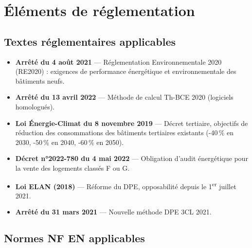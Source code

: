\section{Éléments de réglementation}

\subsection{Textes réglementaires applicables}

\begin{itemize}
  \item \textbf{Arrêté du 4 août 2021} — Réglementation Environnementale 2020 (RE2020) : exigences de performance énergétique et environnementale des bâtiments neufs.
  \item \textbf{Arrêté du 13 avril 2022} — Méthode de calcul Th-BCE 2020 (logiciels homologués).
  \item \textbf{Loi Énergie-Climat du 8 novembre 2019} — Décret tertiaire, objectifs de réduction des consommations des bâtiments tertiaires existants (-40\,\% en 2030, -50\,\% en 2040, -60\,\% en 2050).
  \item \textbf{Décret n°2022-780 du 4 mai 2022} — Obligation d'audit énergétique pour la vente des logements classés F ou G.
  \item \textbf{Loi ELAN (2018)} — Réforme du DPE, opposabilité depuis le 1\textsuperscript{er} juillet 2021.
  \item \textbf{Arrêté du 31 mars 2021} — Nouvelle méthode DPE 3CL 2021.
\end{itemize}

\subsection{Normes NF EN applicables}

